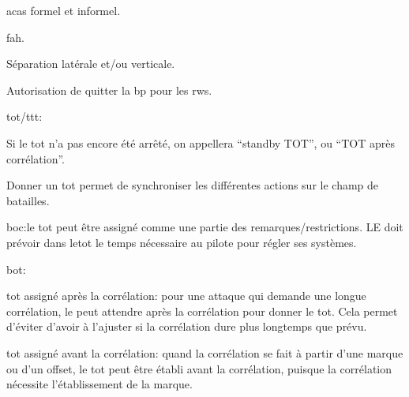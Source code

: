 \begin{e1}
\begin{e2}
\begin{e3}
		\end{e3}
		
	\end{e2}
	
	
	\begin{e2}
		
		\item \glspl{aca} formel et informel.
		\item \gls{fah}.
		\item Séparation latérale et/ou verticale.
		\item Autorisation de quitter la \gls{bp} pour les \glspl{rw}.
		\item \gls{tot}/\gls{ttt}:
		\begin{e3}
			
			\item Si le \gls{tot} n'a pas encore été arrêté, on appellera ``standby TOT'', ou ``TOT après corrélation''.
			
			\item Donner un \gls{tot} permet de synchroniser les différentes actions sur le champ de batailles.
			
			\begin{e4}
				
				\item \gls{boc}:le \gls{tot} peut être assigné comme une partie des remarques/restrictions. LE \ja{} doit prévoir dans le\Gls{tot} le temps nécessaire au pilote pour régler ses systèmes.
				
				\item \gls{bot}:
				
				\begin{e5}
					
					\item \gls{tot} assigné après la corrélation: pour une attaque qui demande une longue corrélation, le \ja{} peut attendre après la corrélation pour donner le \gls{tot}. Cela permet d'éviter d'avoir à l'ajuster si la corrélation dure plus longtemps que prévu.
					
					\item \gls{tot} assigné avant la corrélation: quand la corrélation se fait à partir d'une marque ou d'un offset, le \gls{tot} peut être établi avant la corrélation, puisque la corrélation nécessite l'établissement de la marque.
					

\end{e5}
\end{e4}
\end{e3}
\end{e2}
\end{e1}
